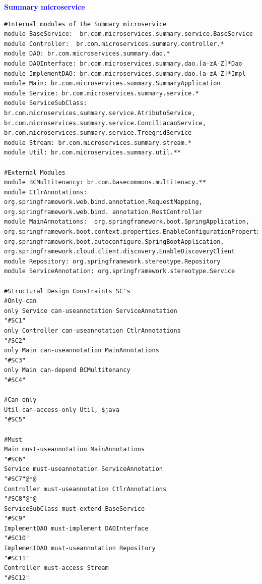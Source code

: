 \documentclass[12pt]{article}
\begin{document}

\newpage
\noindent\textbf{\large{\textcolor{blue}{Summary microservice}}}
\label{sec:ApendiceSummary}

\begin{lstlisting}[style=colorido, caption={\textcolor{blue}{Summary microservice's architectural project specification.}},label={list:especArquiteturalSummary}
]
#Internal modules of the Summary microservice
module BaseService:  br.com.microservices.summary.service.BaseService
module Controller:  br.com.microservices.summary.controller.*
module DAO: br.com.microservices.summary.dao.*
module DAOInterface: br.com.microservices.summary.dao.[a-zA-Z]*Dao
module ImplementDAO: br.com.microservices.summary.dao.[a-zA-Z]*Impl
module Main: br.com.microservices.summary.SummaryApplication
module Service: br.com.microservices.summary.service.*
module ServiceSubClass: br.com.microservices.summary.service.AtributoService, br.com.microservices.summary.service.ConciliacaoService, br.com.microservices.summary.service.TreegridService
module Stream: br.com.microservices.summary.stream.*
module Util: br.com.microservices.summary.util.**

#External Modules
module BCMultitenancy: br.com.basecommons.multitenacy.**
module CtlrAnnotations: org.springframework.web.bind.annotation.RequestMapping, org.springframework.web.bind. annotation.RestController
module MainAnnotations:  org.springframework.boot.SpringApplication, org.springframework.boot.context.properties.EnableConfigurationProperties, org.springframework.boot.autoconfigure.SpringBootApplication, org.springframework.cloud.client.discovery.EnableDiscoveryClient
module Repository: org.springframework.stereotype.Repository
module ServiceAnnotation: org.springframework.stereotype.Service

#Structural Design Constraints SC's
#Only-can
only Service can-useannotation ServiceAnnotation																																		"#SC1" 
only Controller can-useannotation CtlrAnnotations																																	"#SC2"
only Main can-useannotation MainAnnotations																																							"#SC3"
only Main can-depend BCMultitenancy																																															"#SC4"

#Can-only	
Util can-access-only Util, $java																																																		"#SC5"

#Must
Main must-useannotation MainAnnotations																																											"#SC6"
Service must-useannotation ServiceAnnotation																																						"#SC7"@*@
Controller must-useannotation CtlrAnnotations																																					"#SC8"@*@
ServiceSubClass must-extend BaseService																																											"#SC9"
ImplementDAO must-implement DAOInterface																																										"#SC10"
ImplementDAO must-useannotation Repository																																								"#SC11"
Controller must-access Stream																																																					"#SC12"
\end{lstlisting}
\end{document}

